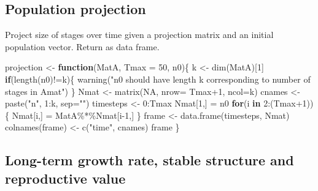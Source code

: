 \documentclass[
]{book}
\newenvironment{Shaded}{\begin{snugshade}}{\end{snugshade}}
\newcommand{\AttributeTok}[1]{\textcolor[rgb]{0.77,0.63,0.00}{#1}}
\newcommand{\ConstantTok}[1]{\textcolor[rgb]{0.00,0.00,0.00}{#1}}
\newcommand{\ControlFlowTok}[1]{\textcolor[rgb]{0.13,0.29,0.53}{\textbf{#1}}}
\newcommand{\DecValTok}[1]{\textcolor[rgb]{0.00,0.00,0.81}{#1}}
\newcommand{\FunctionTok}[1]{\textcolor[rgb]{0.00,0.00,0.00}{#1}}
\newcommand{\NormalTok}[1]{#1}
\newcommand{\OtherTok}[1]{\textcolor[rgb]{0.56,0.35,0.01}{#1}}
\newcommand{\SpecialCharTok}[1]{\textcolor[rgb]{0.00,0.00,0.00}{#1}}
\newcommand{\StringTok}[1]{\textcolor[rgb]{0.31,0.60,0.02}{#1}}
\begin{document}
\hypertarget{population-projection}{%
\subsection{Population projection}\label{population-projection}}

Project size of stages over time given a projection matrix and an initial population vector. Return as data frame.

\begin{Shaded}
\begin{Highlighting}[]
\NormalTok{projection }\OtherTok{\textless{}{-}} \ControlFlowTok{function}\NormalTok{(MatA, }\AttributeTok{Tmax =} \DecValTok{50}\NormalTok{, n0)\{}
\NormalTok{  k }\OtherTok{\textless{}{-}} \FunctionTok{dim}\NormalTok{(MatA)[}\DecValTok{1}\NormalTok{]}
  \ControlFlowTok{if}\NormalTok{(}\FunctionTok{length}\NormalTok{(n0)}\SpecialCharTok{!=}\NormalTok{k)\{}
      \FunctionTok{warning}\NormalTok{(}\StringTok{"n0 should have length }
\StringTok{              k corresponding to }
\StringTok{              number of stages in Amat"}\NormalTok{)}
\NormalTok{      \}}
\NormalTok{  Nmat }\OtherTok{\textless{}{-}} \FunctionTok{matrix}\NormalTok{(}\ConstantTok{NA}\NormalTok{, }\AttributeTok{nrow=}\NormalTok{ Tmax}\SpecialCharTok{+}\DecValTok{1}\NormalTok{, }\AttributeTok{ncol=}\NormalTok{k)}
\NormalTok{  cnames }\OtherTok{\textless{}{-}} \FunctionTok{paste}\NormalTok{(}\StringTok{"n"}\NormalTok{, }\DecValTok{1}\SpecialCharTok{:}\NormalTok{k, }\AttributeTok{sep=}\StringTok{""}\NormalTok{)}
\NormalTok{  timesteps }\OtherTok{\textless{}{-}} \DecValTok{0}\SpecialCharTok{:}\NormalTok{Tmax}
\NormalTok{  Nmat[}\DecValTok{1}\NormalTok{,] }\OtherTok{=}\NormalTok{ n0 }
  \ControlFlowTok{for}\NormalTok{(i }\ControlFlowTok{in} \DecValTok{2}\SpecialCharTok{:}\NormalTok{(Tmax}\SpecialCharTok{+}\DecValTok{1}\NormalTok{))\{  }
\NormalTok{    Nmat[i,] }\OtherTok{=}\NormalTok{ MatA}\SpecialCharTok{\%*\%}\NormalTok{Nmat[i}\DecValTok{{-}1}\NormalTok{,]}
\NormalTok{  \}}
\NormalTok{  frame }\OtherTok{\textless{}{-}} \FunctionTok{data.frame}\NormalTok{(timesteps, Nmat)}
  \FunctionTok{colnames}\NormalTok{(frame) }\OtherTok{\textless{}{-}} \FunctionTok{c}\NormalTok{(}\StringTok{"time"}\NormalTok{, cnames)}
\NormalTok{  frame}
\NormalTok{\}}
\end{Highlighting}
\end{Shaded}

\hypertarget{long-term-growth-rate-stable-structure-and-reproductive-value}{%
\subsection{Long-term growth rate, stable structure and reproductive value}\label{long-term-growth-rate-stable-structure-and-reproductive-value}}
\end{document}
